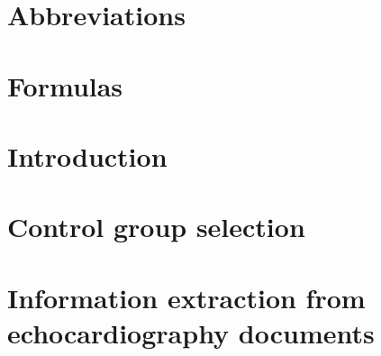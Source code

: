 \documentclass[12pt, a4paper, twoside]{report}
\makeatletter
\def\cleardoublepage{\clearpage\if@twoside \ifodd\c@page\else
    \hbox{}
    \thispagestyle{empty}
    \newpage
    \if@twocolumn\hbox{}\newpage\fi\fi\fi}
\makeatother
\begin{document}
\DeclarePairedDelimiter\abs{\lvert}{\rvert}
\DeclarePairedDelimiter\norm{\lVert}{\rVert}




\cleardoublepage


\cleardoublepage


\cleardoublepage


\cleardoublepage


\cleardoublepage



\tableofcontents
\cleardoublepage

\listoffigures
\cleardoublepage

\listoftables
\cleardoublepage

\listofalgorithms
\cleardoublepage

\chapter*{Abbreviations}
\label{chap:abbreviations}

\cleardoublepage

\chapter*{Formulas}
\label{chap:formulas}

\cleardoublepage



\chapter{Introduction}
\label{chap:introduction}

\cleardoublepage

\chapter{Control group selection}
\label{chap:control_group_selection}

\cleardoublepage

\chapter{Information extraction from echocardiography documents}
\label{chap:text_mining}

\cleardoublepage



\cleardoublepage
\newpage\hbox{~}\thispagestyle{empty}\newpage
\cleardoublepage
\end{document}
